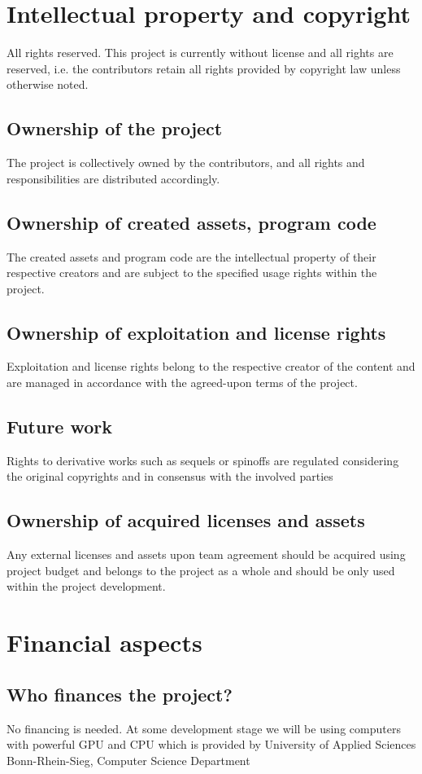 \documentclass{article}
\begin{document}
\section{Intellectual property and copyright}
All rights reserved.
This project is currently without license and all rights are reserved, i.e. the contributors retain all rights provided by copyright law unless otherwise noted.
\subsection{Ownership of the project}
The project is collectively owned by the contributors, and all rights and responsibilities are distributed accordingly.
\subsection{Ownership of created assets, program code}
The created assets and program code are the intellectual property of their respective creators and are subject to the specified usage rights within the project.
\subsection{Ownership of exploitation and license rights}
Exploitation and license rights belong to the respective creator of the content and are managed in accordance with the agreed-upon terms of the project.
\subsection{Future work}
Rights to derivative works such as sequels or spinoffs are regulated considering the original copyrights and in consensus with the involved parties
\subsection{Ownership of acquired licenses and assets}
Any external licenses and assets upon team agreement should be acquired using project budget and belongs to the project as a whole and should be only used within the project development.

\section{Financial aspects}
\subsection{Who finances the project?}
No financing is needed. At some development stage we will be using computers with powerful GPU and CPU which is provided by University of Applied Sciences Bonn-Rhein-Sieg, Computer Science Department
\end{document}

